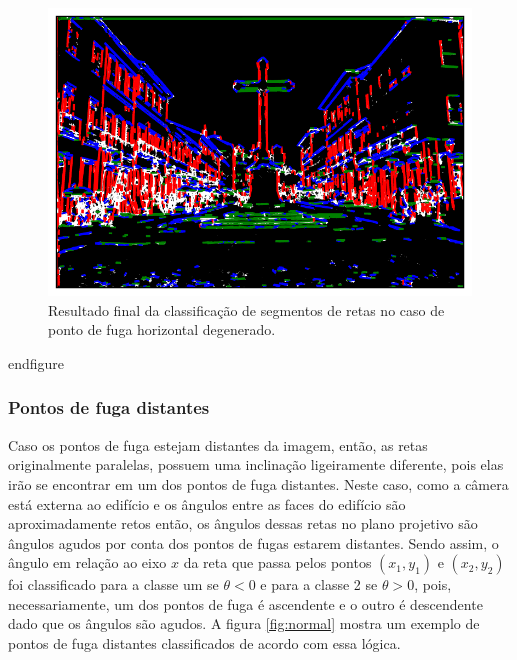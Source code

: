 \documentclass[12pt]{article}
\begin{document}
\begin{figure}[H]
    \centering
    \includegraphics[scale=0.80]{horizonte2.pdf}
    \caption{Resultado final da classificação de segmentos de retas no caso de ponto de fuga horizontal degenerado.}
    \label{fig:horizontal}
    \end{figure}
end{figure}

\subsubsection{Pontos de fuga distantes}

Caso os pontos de fuga estejam distantes da imagem, então, as retas originalmente paralelas, possuem uma inclinação ligeiramente diferente, pois elas irão se encontrar em um dos pontos de fuga distantes. Neste caso, como a câmera está externa ao edifício e os ângulos entre as faces do edifício são aproximadamente retos então, os ângulos dessas retas no plano projetivo são ângulos agudos por conta dos pontos de fugas estarem distantes. Sendo assim, o ângulo em relação ao eixo $x$ da reta que passa pelos pontos $(x_1,y_1)$ e $(x_2,y_2)$ foi classificado para a classe um se $\theta < 0$ e para a classe 2 se $\theta > 0$, pois, necessariamente, um dos pontos de fuga é ascendente e o outro é descendente dado que os ângulos são agudos. A figura \ref*{fig:normal} mostra um exemplo de pontos de fuga distantes classificados de acordo com essa lógica.
\end{document}
